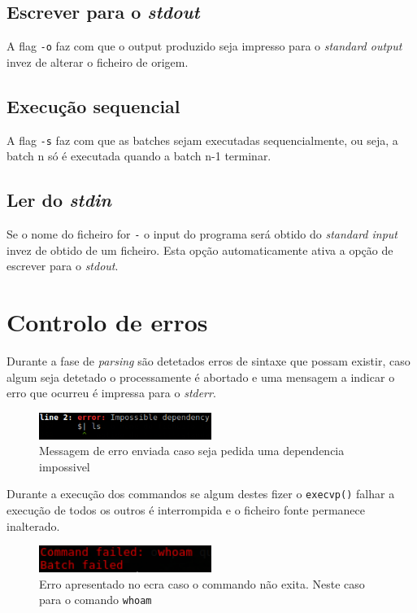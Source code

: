 \documentclass[12pt,a4paper]{report}
\begin{document}
    \section{Escrever para o \textit{stdout}}
        A flag \texttt{-o} faz com que o output produzido seja
        impresso para o \textit{standard output} invez de alterar o ficheiro
        de origem.
    \section{Execução sequencial}
        A flag \texttt{-s} faz com que as batches sejam executadas
        sequencialmente, ou seja, a batch n só é executada quando a batch n-1
        terminar.
    \section{Ler do \textit{stdin}}
        Se o nome do ficheiro for \texttt{-} o input do programa será
        obtido do \textit{standard input} invez de obtido de um ficheiro. Esta
        opção automaticamente ativa a opção de escrever para o \textit{stdout}.

\chapter{Controlo de erros}
    Durante a fase de \textit{parsing} são detetados erros de sintaxe que possam
    existir, caso algum seja detetado o processamente é abortado e uma mensagem
    a indicar o erro que ocurreu é impressa para o \textit{stderr}.

    \begin{figure}[h]
        \centering
        \includegraphics[width=0.5\textwidth]{./images/parseError.png}
        \caption{Messagem de erro enviada caso seja pedida uma dependencia
                    impossivel}
        \label{fig:parseError}
    \end{figure}

    Durante a execução dos commandos se algum destes fizer o
    \texttt{execvp()} falhar a execução de todos os outros é interrompida
    e o ficheiro fonte permanece inalterado.

    \begin{figure}[h]
        \centering
        \includegraphics[width=0.5\textwidth]{./images/execError.png}
        \caption{Erro apresentado no ecra caso o commando não exita. Neste caso
                    para o comando \texttt{whoam}}
    \end{figure}
\end{document}
